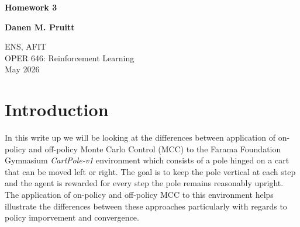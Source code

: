 \documentclass{article}
\begin{document}
\begin{titlepage}
    \centering
    \vspace*{2cm} %
    
    {\Huge \textbf{Homework 3}} \\
    
    \vspace{2cm}
    
    {\Large \textbf{Danen M. Pruitt}} \\
    
    \vspace{1.5cm}
    
    ENS, AFIT \\
    OPER 646: Reinforcement Learning \\
    May 2026
    
    \vfill %
    
\end{titlepage}

\newpage
\tableofcontents
\newpage

\section{Introduction}
In this write up we will be looking at the differences between application of on-policy and off-policy Monte Carlo Control (MCC) to the Farama Foundation Gymnasium \textit{CartPole-v1} environment which consists of a pole hinged on a cart that can be moved left or right. The goal is to keep the pole vertical at each step and the agent is rewarded for every step the pole remains reasonably upright. The application of on-policy and off-policy MCC to this environment helps illustrate the differences between these approaches particularly with regards to policy imporvement and convergence.
\end{document}
